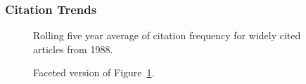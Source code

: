 \documentclass[
  10pt,
  letterpaper,
  DIV=11,
  numbers=noendperiod,
  twoside]{scrartcl}
\begin{document}
\subsubsection*{Citation Trends}\label{citation-trends-12}

\begin{figure}


\caption{\label{fig-citation-spaghetti-1988}Rolling five year average of
citation frequency for widely cited articles from 1988.}

\end{figure}%

\begin{figure}


\caption{\label{fig-citation-facet-1988}Faceted version of
Figure~\ref{fig-citation-spaghetti-1988}.}

\end{figure}%
\end{document}

